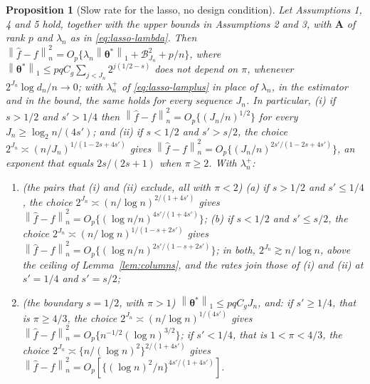 \documentclass[10pt]{book}
\newtheorem{proposition}{Proposition}[section]
\theoremstyle{definition}
\newcommand{\norm}[1]{\left\lVert #1 \right\rVert}
\newcommand{\normn}[1]{\left\lVert #1 \right\rVert_{n}}
\newcommand{\lev}{j}
\newcommand{\btheta}{\boldsymbol{\theta}}
\newcommand{\thetastar}{\btheta^{*}}
\newcommand{\penn}{\lambda_{n}}
\newcommand{\seff}{s'}
\newcommand{\Amat}{\mathbf{A}}
\begin{document}
{%
\begin{proposition}[Slow rate for the lasso, no design condition]
\label{prop:lasso-slow}
Let Assumptions 1, 4 and 5 hold, \textcolor{colR1}{together with the upper
bounds in Assumptions 2 and 3,} with $\Amat$ of rank $p$ and $\penn$ as in
\eqref{eq:lasso-lambda}. Then
$\normn{\widehat{f}-f}^{2} = O_p\{\penn\norm{\thetastar}_{1} +
\mathcal{B}_{J_n}^{2} + p/n\}$, where
$\norm{\thetastar}_{1} \le pqC_g\sum_{\lev<J_n}2^{\lev(1/2-s)}$ does not
depend on $\pi$, whenever $2^{J_n}\log d_n/n \to 0$; with $\penn^{+}$ of
\eqref{eq:lasso-lamplus} in place of $\penn$, in the estimator and in the
bound, the same holds for every sequence $J_n$. In particular, (i) if $s > 1/2$ and $\seff > 1/4$ then
$\normn{\widehat{f}-f}^{2} = O_p\{(J_n/n)^{1/2}\}$ for every
$J_n \ge \log_2 n/(4\seff)$; and (ii) if $s < 1/2$ and $\seff > s/2$, the choice
$2^{J_n} \asymp (n/J_n)^{1/(1-2s+4\seff)}$ gives
$\normn{\widehat{f}-f}^{2} = O_p\{(J_n/n)^{2\seff/(1-2s+4\seff)}\}$, an
exponent that equals $2s/(2s+1)$ when $\pi \ge 2$. With $\penn^{+}$:
\begin{enumerate}
\item[(iii)] (the pairs that (i) and (ii) exclude, all with $\pi < 2$)
(a) if $s > 1/2$ and $\seff \le 1/4$, the choice
$2^{J_n} \asymp (n/\log n)^{2/(1+4\seff)}$ gives
$\normn{\widehat{f}-f}^{2} = O_p\{(\log n/n)^{4\seff/(1+4\seff)}\}$;
(b) if $s < 1/2$ and $\seff \le s/2$, the choice
$2^{J_n} \asymp (n/\log n)^{1/(1-s+2\seff)}$ gives
$\normn{\widehat{f}-f}^{2} = O_p\{(\log n/n)^{2\seff/(1-s+2\seff)}\}$;
in both, $2^{J_n} \gtrsim n/\log n$, above the ceiling of
Lemma~\ref{lem:columns}, and the rates join those of (i) and (ii) at
$\seff = 1/4$ and $\seff = s/2$;
\item[(iv)] (the boundary $s = 1/2$, with $\pi > 1$)
$\norm{\thetastar}_{1} \le pqC_gJ_n$, and: if $\seff \ge 1/4$, that is
$\pi \ge 4/3$, the choice $2^{J_n} \asymp (n/\log n)^{1/(4\seff)}$ gives
$\normn{\widehat{f}-f}^{2} = O_p\{n^{-1/2}(\log n)^{3/2}\}$; if
$\seff < 1/4$, that is $1 < \pi < 4/3$, the choice
$2^{J_n} \asymp \{n/(\log n)^{2}\}^{2/(1+4\seff)}$ gives
$\normn{\widehat{f}-f}^{2} = O_p[\{(\log n)^{2}/n\}^{4\seff/(1+4\seff)}]$.
\end{enumerate}
\end{proposition}

}
\end{document}
